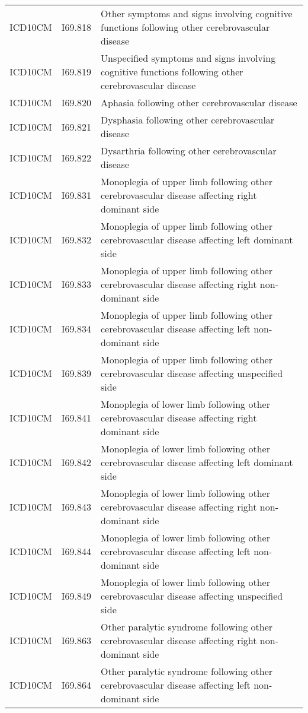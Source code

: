 \begin{longtable}{p{}p{}p{}}
  ICD10CM & I69.818 & Other symptoms and signs involving cognitive functions following other cerebrovascular disease \\ 
  ICD10CM & I69.819 & Unspecified symptoms and signs involving cognitive functions following other cerebrovascular disease \\ 
  ICD10CM & I69.820 & Aphasia following other cerebrovascular disease \\ 
  ICD10CM & I69.821 & Dysphasia following other cerebrovascular disease \\ 
  ICD10CM & I69.822 & Dysarthria following other cerebrovascular disease \\ 
  ICD10CM & I69.831 & Monoplegia of upper limb following other cerebrovascular disease affecting right dominant side \\ 
  ICD10CM & I69.832 & Monoplegia of upper limb following other cerebrovascular disease affecting left dominant side \\ 
  ICD10CM & I69.833 & Monoplegia of upper limb following other cerebrovascular disease affecting right non-dominant side \\ 
  ICD10CM & I69.834 & Monoplegia of upper limb following other cerebrovascular disease affecting left non-dominant side \\ 
  ICD10CM & I69.839 & Monoplegia of upper limb following other cerebrovascular disease affecting unspecified side \\ 
  ICD10CM & I69.841 & Monoplegia of lower limb following other cerebrovascular disease affecting right dominant side \\ 
  ICD10CM & I69.842 & Monoplegia of lower limb following other cerebrovascular disease affecting left dominant side \\ 
  ICD10CM & I69.843 & Monoplegia of lower limb following other cerebrovascular disease affecting right non-dominant side \\ 
  ICD10CM & I69.844 & Monoplegia of lower limb following other cerebrovascular disease affecting left non-dominant side \\ 
  ICD10CM & I69.849 & Monoplegia of lower limb following other cerebrovascular disease affecting unspecified side \\ 
  ICD10CM & I69.863 & Other paralytic syndrome following other cerebrovascular disease affecting right non-dominant side \\ 
  ICD10CM & I69.864 & Other paralytic syndrome following other cerebrovascular disease affecting left non-dominant side \\ 

\end{longtable}
